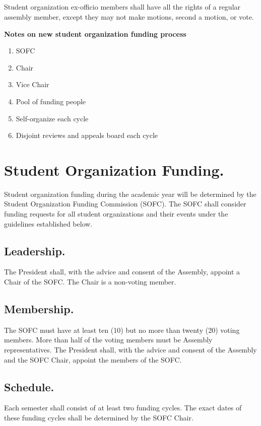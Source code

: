 \subsection{}
Student organization ex-officio members shall have all the rights of a regular assembly member, except they may not make motions, second a motion, or vote.


\begin{framed}
\textbf{Notes on new student organization funding process}
\begin{enumerate}
\item SOFC
\item Chair
\item Vice Chair
\item Pool of funding people
\item Self-organize each cycle 
\item Disjoint reviews and appeals board each cycle
\end{enumerate}
\end{framed}


\section{Student Organization Funding.}
Student organization funding during the academic year will be determined by the Student Organization Funding Commission (SOFC).  The SOFC shall consider funding requests for all student organizations and their events under the guidelines established below.

\subsection{Leadership.}
The President shall, with the advice and consent of the Assembly, appoint a Chair of the SOFC.  The Chair is a non-voting member.

\subsection{Membership.}
The SOFC must have at least ten (10) but no more than twenty (20) voting members.  More than half of the voting members must be Assembly representatives.  The President shall, with the advice and consent of the Assembly and the SOFC Chair, appoint the members of the SOFC.

\subsection{Schedule.}
Each semester shall consist of at least two funding cycles.  The exact dates of these funding cycles shall be determined by the SOFC Chair.


